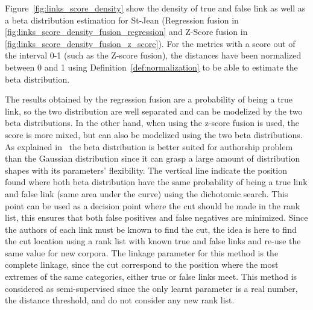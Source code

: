 Figure~\ref{fig:links_score_density} show the density of true and false link as well as a beta distribution estimation for St-Jean (Regression fusion in \ref{fig:links_score_density_fusion_regression} and Z-Score fusion in \ref{fig:links_score_density_fusion_z_score}).
For the metrics with a score out of the interval 0-1 (such as the Z-score fusion), the distances have been normalized between 0 and 1 using Definition~\ref{def:normalization} to be able to estimate the beta distribution.

The results obtained by the regression fusion are a probability of being a true link, so the two distribution are well separated and can be modelized by the two beta distributions.
In the other hand, when using the z-score fusion is used, the score is more mixed, but can also be modelized using the two beta distributions.
As explained in~\cite{savoy_probability} the beta distribution is better suited for authorship problem than the Gaussian distribution since it can grasp a large amount of distribution shapes with its parameters' flexibility.
The vertical line indicate the position found where both beta distribution have the same probability of being a true link and false link (same area under the curve) using the dichotomic search.
This point can be used as a decision point where the cut should be made in the rank list, this ensures that both false positives and false negatives are minimized.
Since the authors of each link must be known to find the cut, the idea is here to find the cut location using a rank list with known true and false links and re-use the same value for new corpora.
The linkage parameter for this method is the complete linkage, since the cut correspond to the position where the most extremes of the same categories, either true or false links meet.
This method is considered as semi-supervised since the only learnt parameter is a real number, the distance threshold, and do not consider any new rank list.

